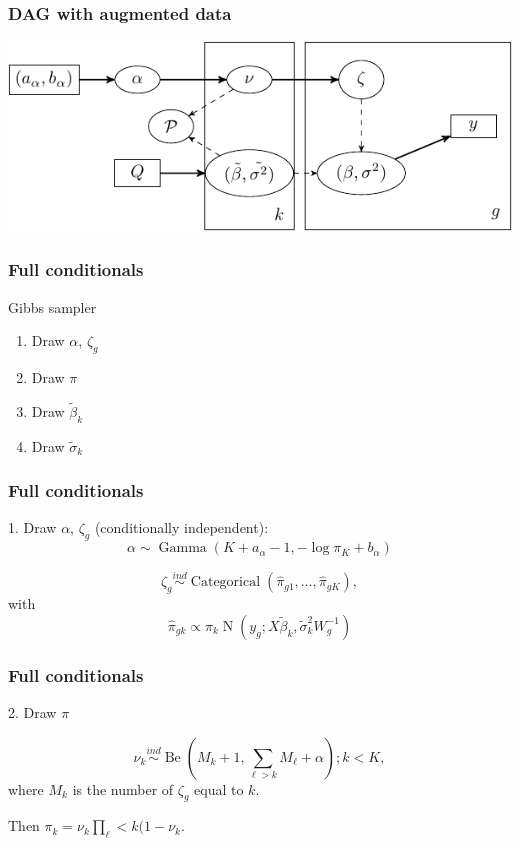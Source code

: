 \documentclass[handout]{beamer}
\newcommand{\op}{\operatorname}
\newcommand{\ind}{\stackrel{ind}{\sim}}
\begin{document}
\begin{frame}%
  \frametitle{DAG with augmented data}
  \includegraphics[width=\textwidth]{my_dag_small}
\end{frame}

\begin{frame}%
  \frametitle{Full conditionals}
  \begin{beamerboxesrounded}[upper=upcol,lower=lowcol,shadow=true]{Gibbs sampler}
    \begin{enumerate}
      \item Draw $\alpha$, $\zeta_g$
      \item Draw $\pi$
      \item Draw $\tilde{\beta}_k$
      \item Draw $\tilde{\sigma}_k$
    \end{enumerate}
  \end{beamerboxesrounded}
\end{frame}

\begin{frame}%
  \frametitle{Full conditionals}
  1. Draw $\alpha$, $\zeta_g$ (conditionally independent):\\

  \[\alpha \sim \op{Gamma}(K + a_\alpha - 1, -\log \pi_K + b_\alpha)\]

  \[\zeta_g \ind \op{Categorical}\left(\hat{\pi}_{g1},\ldots,\hat{\pi}_{gK} \right),\]
  with
  \[\hat{\pi}_{gk} \propto \pi_k \op{N}\left( y_g;X\tilde{\beta}_k,\tilde{\sigma}_k^2 W_g^{-1} \right)\]
\end{frame}

\begin{frame}%
  \frametitle{Full conditionals}
  2. Draw $\pi$

  \[\nu_k \ind \op{Be}(M_k + 1, \sum_{\ell>k}M_\ell + \alpha); k < K,\]
  where $M_k$ is the number of $\zeta_g$ equal to $k$.

  Then $\pi_k = \nu_k \prod_\ell<k(1-\nu_k$.
\end{frame}
\end{document}
